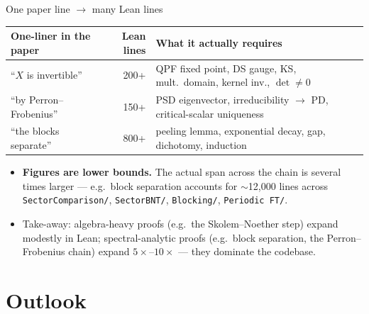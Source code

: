 \documentclass[aspectratio=169,10pt]{beamer}
\begin{document}
\begin{frame}{One paper line $\to$ many Lean lines}
    \begin{center}
    \renewcommand{\arraystretch}{1.2}
    {\footnotesize
    \begin{tabular}{@{}l r l@{}}
        \toprule
        \textbf{One-liner in the paper} & \textbf{Lean lines} & \textbf{What it actually requires} \\
        \midrule
        ``$X$ is invertible''             & 200+ & QPF fixed point, DS gauge, KS, mult.\ domain, kernel inv., $\det \neq 0$ \\
        ``by Perron--Frobenius''          & 150+ & PSD eigenvector, irreducibility $\to$ PD, critical-scalar uniqueness \\
        ``the blocks separate''           & 800+ & peeling lemma, exponential decay, gap, dichotomy, induction \\
        \bottomrule
    \end{tabular}}
    \end{center}
    \vspace{0.4em}
    \begin{itemize}
        \footnotesize
        \item \textbf{Figures are lower bounds.} The actual span across the chain is several times larger --- e.g.\ block separation accounts for $\sim$12{,}000 lines across \texttt{SectorComparison/}, \texttt{SectorBNT/}, \texttt{Blocking/}, \texttt{Periodic\,FT/}.
        \item Take-away: algebra-heavy proofs (e.g.\ the Skolem--Noether step) expand modestly in Lean; spectral-analytic proofs (e.g.\ block separation, the Perron--Frobenius chain) expand $5\times$--$10\times$ --- they dominate the codebase.
    \end{itemize}
\end{frame}

\section{Outlook}
\end{document}
